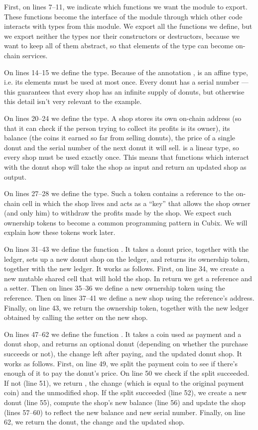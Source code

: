 First, on lines 7--11, we indicate which functions we want the module to export. These functions become the interface of the module through which other code interacts with types from this module. We export all the functions we define, but we export neither the types nor their constructors or destructors, because we want to keep all of them abstract, so that elements of the  type can become on-chain services.

On lines 14--15 we define the  type. Because of the annotation ,  is an affine type, i.e. its elements must be used at most once. Every donut has a serial number --- this guarantees that every shop has an infinite supply of donuts, but otherwise this detail isn't very relevant to the example.

On lines 20--24 we define the  type. A shop stores its own on-chain address (so that it can check if the person trying to collect its profits is its owner), its balance (the coins it earned so far from selling donuts), the price of a single donut and the serial number of the next donut it will sell.  is a linear type, so every shop must be used exactly once. This means that functions which interact with the donut shop will take the shop as input and return an updated shop as output.

On lines 27--28 we define the  type. Such a token contains a reference to the on-chain cell in which the shop lives and acts as a ``key'' that allows the shop owner (and only him) to withdraw the profits made by the shop. We expect such ownership tokens to become a common programming pattern in Cubix. We will explain how these tokens work later.

On lines 31--43 we define the function . It takes a donut price, together with the ledger, sets up a new donut shop on the ledger, and returns its ownership token, together with the new ledger. It works as follows. First, on line 34, we create a new mutable shared cell that will hold the shop. In return we get a reference and a setter. Then on lines 35--36 we define a new ownership token using the reference. Then on lines 37--41 we define a new shop using the reference's address. Finally, on line 43, we return the ownership token, together with the new ledger obtained by calling the setter  on the new shop.

On lines 47--62 we define the function . It takes a coin used as payment and a donut shop, and returns an optional donut (depending on whether the purchase succeeds or not), the change left after paying, and the updated donut shop. It works as follows. First, on line 49, we split the payment coin to see if there's enough of it to pay the donut's price. On line 50 we check if the split succeeded. If not (line 51), we return , the change (which is equal to the original payment coin) and the unmodified shop. If the split succeeded (line 52), we create a new donut (line 55), compute the shop's new balance (line 56) and update the shop (lines 57--60) to reflect the new balance and new serial number. Finally, on line 62, we return the donut, the change and the updated shop.

